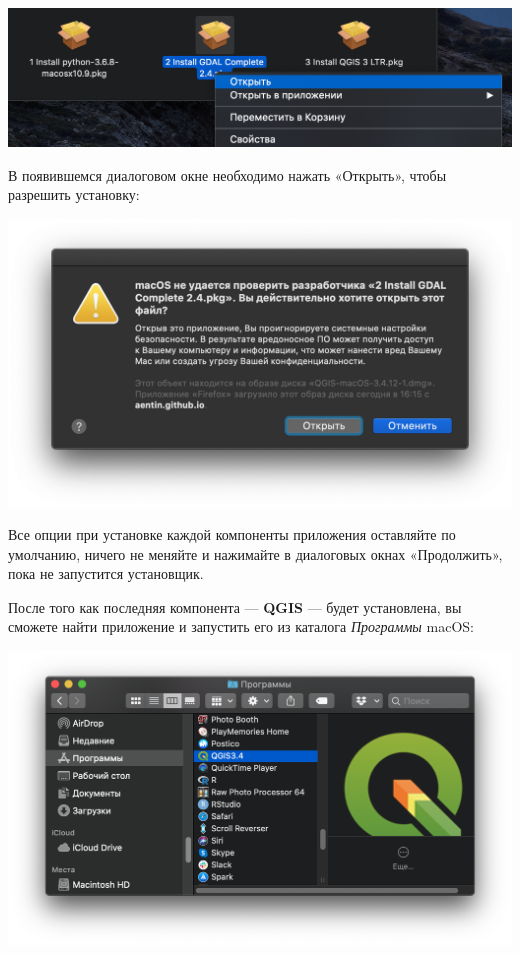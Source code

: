 \documentclass[
  12pt,
]{book}
\begin{document}
\includegraphics{images/Index0/mac03.png}

В появившемся диалоговом окне необходимо нажать «Открыть», чтобы разрешить установку:

\includegraphics{images/Index0/mac04.png}

Все опции при установке каждой компоненты приложения оставляйте по умолчанию, ничего не меняйте и нажимайте в диалоговых окнах «Продолжить», пока не запустится установщик.

После того как последняя компонента --- \textbf{QGIS} --- будет установлена, вы сможете найти приложение и запустить его из каталога \emph{Программы} macOS:

\includegraphics{images/Index0/mac05.png}
\end{document}
